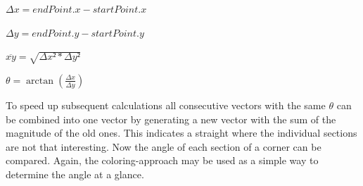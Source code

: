 \begin{minipage}{\textwidth}
\begin{center}
$\Delta x = endPoint.x - startPoint.x$

$\Delta y = endPoint.y - startPoint.y$

$\overline{xy} = \sqrt{\Delta x² * \Delta y²}$

$\theta = \arctan(\frac{\Delta x}{\Delta y})$ 
\end{center}
\end{minipage}

To speed up subsequent calculations all consecutive vectors with the same $\theta$ can be combined into one vector by generating a new vector with the sum of the magnitude of the old ones. This indicates a straight where the individual sections are not that interesting.
Now the angle of each section of a corner can be compared. Again, the coloring-approach may be used as a simple way to determine the angle at a glance.
\clearpage
